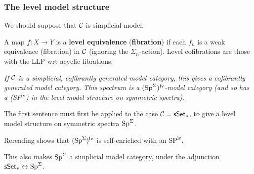 \begin{MichaelStableModelCats}
\subsubsection*{The level model structure}
\begin{itemise}
\item We should suppose that $\mathcal{C}$ is simplicial model.
\item A map $f:X\to Y$ is a \textbf{level equivalence} (\textbf{fibration}) if each $f_n$ is a weak equivalence (fibration) in $\mathcal{C}$ (ignoring the $\Sigma_n$-action). Level cofibrations are those with the LLP wrt acyclic fibrations.
\item \textit{If $\mathcal{C}$ is a simplicial, cofibrantly generated model category, this gives a cofibrantly generated model category. This spectrum is a $(\operatorname{Sp}^\Sigma)^\textup{lv}$-model category (and so has a \textup{(SP$^\text{lv}$)} in the level model structure on symmetric spectra)}.%
\begin{itemise}
\item The first sentence must first be applied to the case $\mathcal{C}=\operatorname{{\mathsf{sSet}}}_*$, to give a level model structure on symmetric spectra $\operatorname{Sp}^\Sigma$.
\item Rereading shows that $(\operatorname{Sp}^\Sigma)^\text{lv}$ is self-enriched with an SP$^\text{lv}$.
\item This also makes $\operatorname{Sp}^\Sigma$ a simplicial model category, under the adjunction $\operatorname{{\mathsf{sSet}}}_*\leftrightarrow\operatorname{Sp}^\Sigma$.
\end{itemise}
\end{itemise}

\end{MichaelStableModelCats}
